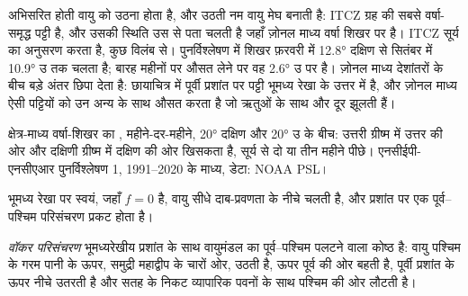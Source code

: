 अभिसरित होती वायु को उठना होता है, और उठती नम वायु मेघ बनाती है: ITCZ ग्रह की सबसे वर्षा-समृद्ध पट्टी है, और उसकी स्थिति उस  से पता चलती है जहाँ ज़ोनल माध्य वर्षा शिखर पर है। ITCZ सूर्य का अनुसरण करता है, कुछ विलंब से। पुनर्विश्लेषण में शिखर फ़रवरी में \ang{12.8} दक्षिण से सितंबर में \ang{10.9} उ तक चलता है; बारह महीनों पर औसत लेने पर वह \ang{2.6} उ पर है। ज़ोनल माध्य देशांतरों के बीच बड़े अंतर छिपा देता है: छायाचित्र में पूर्वी प्रशांत पर पट्टी भूमध्य रेखा के उत्तर में है, और ज़ोनल माध्य ऐसी पट्टियों को उन अन्य के साथ औसत करता है जो ऋतुओं के साथ और दूर झूलती हैं।

\begin{omfigure}

{\small क्षेत्र-माध्य वर्षा-शिखर का , महीने-दर-महीने, \ang{20} दक्षिण और \ang{20} उ के बीच:  उत्तरी ग्रीष्म में उत्तर की ओर और दक्षिणी ग्रीष्म में दक्षिण की ओर खिसकता है, सूर्य से दो या तीन महीने पीछे। एनसीईपी-एनसीएआर पुनर्विश्लेषण 1, 1991--2020 के माध्य, डेटा: NOAA PSL।}
\label{fig:b1:atmospheric-circulation:itcz}
\end{omfigure}

भूमध्य रेखा पर स्वयं, जहाँ $f = 0$ है, वायु सीधे दाब-प्रवणता के नीचे चलती है, और प्रशांत पर एक पूर्व--पश्चिम परिसंचरण प्रकट होता है।

\begin{definition}[वॉकर परिसंचरण]\label{def:b1:atmospheric-circulation:walker}
\emph{वॉकर परिसंचरण} भूमध्यरेखीय प्रशांत के साथ वायुमंडल का पूर्व--पश्चिम पलटने वाला कोष्ठ है: वायु पश्चिम के गरम पानी के ऊपर, समुद्री महाद्वीप के चारों ओर, उठती है, ऊपर पूर्व की ओर बहती है, पूर्वी प्रशांत के ऊपर नीचे उतरती है और सतह के निकट व्यापारिक पवनों के साथ पश्चिम की ओर लौटती है।
\end{definition}


